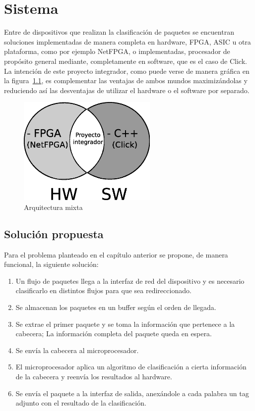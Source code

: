 \chapter{Sistema}

Entre de dispositivos que realizan la clasificación de paquetes se encuentran soluciones implementadas de manera completa en hardware, FPGA, ASIC u otra plataforma, como por ejemplo NetFPGA\cite{netfpga}, o implementadas, procesador de propósito general mediante, completamente en software, que es el caso de Click\cite{click}. La intención de este proyecto integrador, como puede verse de manera gráfica en la figura~\ref{fig:hwsw}, es complementar las ventajas de ambos mundos maximizándolas y reduciendo así las desventajas de utilizar el hardware o el software por separado. 


 \begin{figure}[h]
  \centering
	 \includegraphics[width=0.6\textwidth]{2-sistema/graf/interseccion.eps}
  \caption{Arquitectura mixta}
  \label{fig:hwsw}
\end{figure}


\section{Solución propuesta}

Para el problema planteado en el capítulo anterior se propone, de manera funcional, la siguiente solución: 

    \begin{enumerate}
  	\item Un flujo de paquetes llega a la interfaz de red del dispositivo y es necesario clasificarlo en distintos flujos para que sea redireccionado.
	\item Se almacenan los paquetes en un buffer según el orden de llegada.
	\item Se extrae el primer paquete y se toma la información que pertenece a la cabecera; La información completa del paquete queda en espera.
	\item Se envía la cabecera al microprocesador.
	\item El microprocesador aplica un algoritmo de clasificación a cierta información de la cabecera y reenvía los resultados al hardware. 
	\item Se envía el paquete a la interfaz de salida, anexándole a cada palabra un tag adjunto con el resultado de la clasificación.
    \end{enumerate}
\newpage
